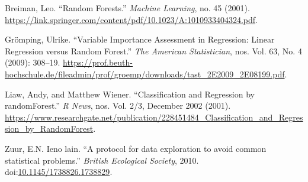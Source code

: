 \documentclass[a4paper, nobind]{templates/ociamthesis}
\newcommand*{\bibtitle}{Works Cited}
\begin{document}
\hypertarget{refs}{}
\leavevmode\hypertarget{ref-Breiman2001}{}%
Breiman, Leo. ``Random Forests.'' \emph{Machine Learning}, no. 45 (2001). \url{https://link.springer.com/content/pdf/10.1023/A:1010933404324.pdf}.

\leavevmode\hypertarget{ref-Groemping2009}{}%
Grömping, Ulrike. ``Variable Importance Assessment in Regression: Linear Regression versus Random Forest.'' \emph{The American Statistician}, nos. Vol. 63, No. 4 (2009): 308--19. \url{https://prof.beuth-hochschule.de/fileadmin/prof/groemp/downloads/tast_2E2009_2E08199.pdf}.

\leavevmode\hypertarget{ref-Liaw2002}{}%
Liaw, Andy, and Matthew Wiener. ``Classification and Regression by randomForest.'' \emph{R News}, nos. Vol. 2/3, December 2002 (2001). \url{https://www.researchgate.net/publication/228451484_Classification_and_Regression_by_RandomForest}.

\leavevmode\hypertarget{ref-Zuur2010}{}%
Zuur, E.N. Ieno lain. ``A protocol for data exploration to avoid common statistical problems.'' \emph{British Ecological Society}, 2010. doi:\href{https://doi.org/10.1145/1738826.1738829}{10.1145/1738826.1738829}.




\setlength{\baselineskip}{0pt} %

{\renewcommand*\MakeUppercase[1]{#1}%
\printbibliography[heading=bibintoc,title={\bibtitle}]}
\end{document}
